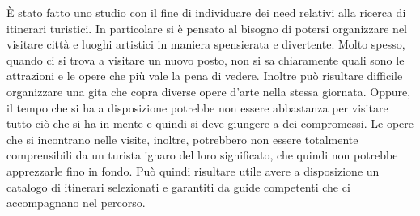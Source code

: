È stato fatto uno studio con il fine di individuare dei need relativi alla ricerca
di itinerari turistici. In particolare si è pensato al bisogno di potersi organizzare nel visitare città e
luoghi artistici in maniera spensierata e divertente. Molto spesso, quando ci si trova a 
visitare un nuovo posto, non si sa chiaramente quali sono le attrazioni e le opere che più
vale la pena di vedere. Inoltre può risultare difficile organizzare una gita che copra
diverse opere d'arte nella stessa giornata. Oppure, il tempo che si ha a disposizione potrebbe non
essere abbastanza per visitare tutto ciò che si ha in mente e quindi si deve giungere a dei compromessi.
Le opere che si incontrano nelle visite, inoltre, potrebbero non essere totalmente comprensibili
da un turista ignaro del loro significato, che quindi non potrebbe apprezzarle fino in fondo.
Può quindi risultare utile avere a disposizione un catalogo di itinerari selezionati e
garantiti da guide competenti che ci accompagnano nel percorso.
